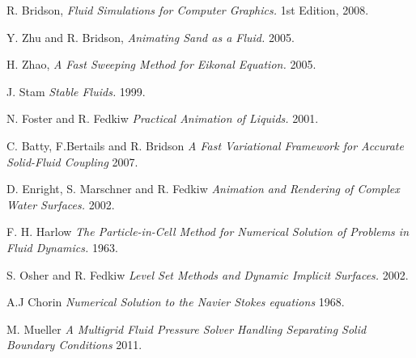 \begin{thebibliography}{9}

  R. Bridson,
  \emph{Fluid Simulations for Computer Graphics.}
  1st Edition,
  2008.

  Y. Zhu and R. Bridson,
  \emph{Animating Sand as a Fluid.}
  2005.

  H. Zhao, 
  \emph{A Fast Sweeping Method for Eikonal Equation.}
  2005.

  J. Stam
  \emph{Stable Fluids.}
  1999.

  N. Foster and R. Fedkiw
  \emph{Practical Animation of Liquids.}
  2001.

  C. Batty, F.Bertails and R. Bridson
  \emph{A Fast Variational Framework for Accurate Solid-Fluid Coupling}
  2007.

  D. Enright, S. Marschner and R. Fedkiw
  \emph{Animation and Rendering of Complex Water Surfaces.}
  2002.

  F. H. Harlow 
  \emph{The Particle-in-Cell Method for Numerical Solution of Problems in Fluid Dynamics.}
  1963.

  S. Osher and R. Fedkiw
  \emph{Level Set Methods and Dynamic Implicit Surfaces.}
  2002.

  A.J Chorin
  \emph{Numerical Solution to the Navier Stokes equations}
  1968.

  M. Mueller
  \emph{A Multigrid Fluid Pressure Solver Handling Separating Solid Boundary Conditions}
  2011.

\end{thebibliography}
